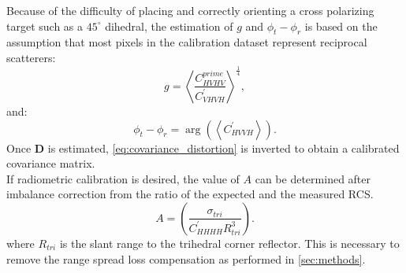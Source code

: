 Because of the difficulty of placing and correctly orienting a cross polarizing target such as a $45^\circ$ dihedral, the estimation of $g$ and $\phi_t - \phi_r$ is based on the assumption that most pixels in the calibration dataset represent reciprocal scatterers:
\begin{equation}
	g = \left<\frac{C_{HVHV}^{prime}}{C_{VHVH}^{\prime}}\right>^\frac{1}{4},
\end{equation}
and:
\begin{equation}
	\phi_t - \phi_r =\operatorname{arg}\left( \left<C_{HVVH}^{\prime}\right>\right).
\end{equation}
Once $\mathbf{D}$ is estimated, \autoref{eq:covariance_distortion} is inverted to obtain a calibrated covariance matrix.\\
If radiometric calibration is desired, the value of $A$ can be determined after imbalance correction from the ratio of the expected and the measured RCS.
\begin{equation}
	A =	\left(\frac{\sigma_{tri}}{C^{\prime}_{HHHH} R_{tri}^{3}}\right).
\end{equation}
where $R_{tri}$ is the slant range to the trihedral corner reflector. This is necessary to remove the range spread loss compensation as performed in \autoref{sec:methods}.
